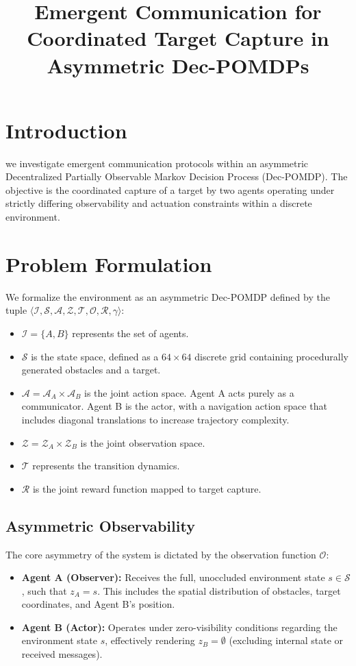 \documentclass{article}
\title{Emergent Communication for Coordinated Target Capture in Asymmetric Dec-POMDPs}
\author{}
\date{}
\begin{document}
\maketitle

\section{Introduction}
we investigate emergent communication protocols within an asymmetric Decentralized Partially Observable Markov Decision Process (Dec-POMDP). The objective is the coordinated capture of a target by two agents operating under strictly differing observability and actuation constraints within a discrete environment.

\section{Problem Formulation}
We formalize the environment as an asymmetric Dec-POMDP defined by the tuple $\langle \mathcal{I}, \mathcal{S}, \mathcal{A}, \mathcal{Z}, \mathcal{T}, \mathcal{O}, \mathcal{R}, \gamma \rangle$:

\begin{itemize}
    \item $\mathcal{I} = \{A, B\}$ represents the set of agents.
    \item $\mathcal{S}$ is the state space, defined as a $64 \times 64$ discrete grid containing procedurally generated obstacles and a target.
    \item $\mathcal{A} = \mathcal{A}_A \times \mathcal{A}_B$ is the joint action space. Agent A acts purely as a communicator. Agent B is the actor, with a navigation action space that includes diagonal translations to increase trajectory complexity.
    \item $\mathcal{Z} = \mathcal{Z}_A \times \mathcal{Z}_B$ is the joint observation space.
    \item $\mathcal{T}$ represents the transition dynamics.
    \item $\mathcal{R}$ is the joint reward function mapped to target capture.
\end{itemize}

\subsection{Asymmetric Observability}
The core asymmetry of the system is dictated by the observation function $\mathcal{O}$:
\begin{itemize}
    \item \textbf{Agent A (Observer):} Receives the full, unoccluded environment state $s \in \mathcal{S}$, such that $z_A = s$. This includes the spatial distribution of obstacles, target coordinates, and Agent B's position.
    \item \textbf{Agent B (Actor):} Operates under zero-visibility conditions regarding the environment state $s$, effectively rendering $z_B = \emptyset$ (excluding internal state or received messages).
\end{itemize}
\end{document}
